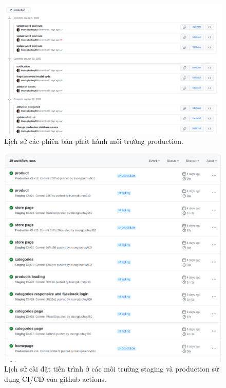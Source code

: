 \FloatBarrier
\begin{figure}[!htbp]
	\begin{center}	
		\includegraphics[width=\textwidth]{./results/commit}
		\caption{Lịch sử các phiên bản phát hành môi trường production.}
	\end{center}
	
\end{figure}
\clearpage
\FloatBarrier
\begin{figure}[!htbp]
	\begin{center}	
		\includegraphics[width=\textwidth]{./results/deployments}
		\caption{Lịch sử cài đặt tiến trình ở các môi trường staging và production sử dụng CI/CD của github actions.}
	\end{center}
	
\end{figure}
